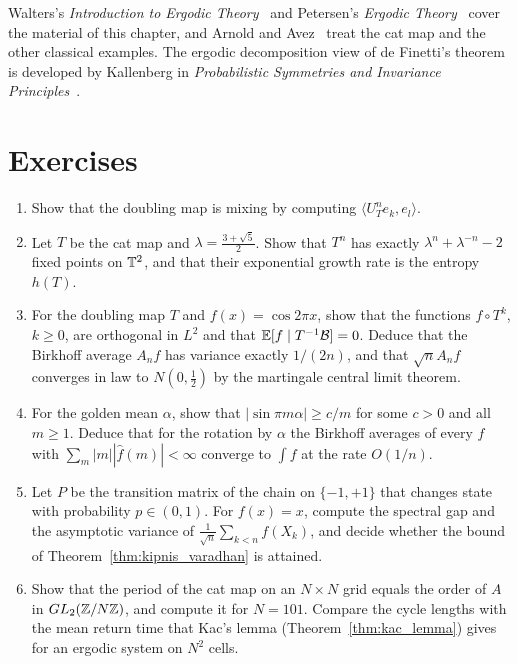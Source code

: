 Walters's \emph{Introduction to Ergodic Theory}~\cite{walters1982} and Petersen's \emph{Ergodic Theory}~\cite{petersen1983} cover the material of this chapter, and Arnold and Avez~\cite{arnoldavez1968} treat the cat map and the other classical examples. The ergodic decomposition view of de Finetti's theorem is developed by Kallenberg in \emph{Probabilistic Symmetries and Invariance Principles}~\cite{kallenberg2005}.

\section*{Exercises}
\begin{enumerate}
\item Show that the doubling map is mixing by computing $\langle U_T^ne_k,e_l\rangle$.
\item Let $T$ be the cat map and $\lambda = \frac{3+\sqrt5}{2}$. Show that $T^n$ has exactly $\lambda^n+\lambda^{-n}-2$ fixed points on $\mathbb{T}^2$, and that their exponential growth rate is the entropy $h(T)$.
\item For the doubling map $T$ and $f(x) = \cos2\pi x$, show that the functions $f\circ T^k$, $k\geq0$, are orthogonal in $L^2$ and that $\mathbb{E}[f\mid T^{-1}\mathcal{B}] = 0$. Deduce that the Birkhoff average $A_nf$ has variance exactly $1/(2n)$, and that $\sqrt nA_nf$ converges in law to $N(0,\frac12)$ by the martingale central limit theorem.
\item For the golden mean $\alpha$, show that $|\sin\pi m\alpha|\geq c/m$ for some $c>0$ and all $m\geq1$. Deduce that for the rotation by $\alpha$ the Birkhoff averages of every $f$ with $\sum_m|m||\hat f(m)|<\infty$ converge to $\int f$ at the rate $O(1/n)$.
\item Let $P$ be the transition matrix of the chain on $\{-1,+1\}$ that changes state with probability $p\in(0,1)$. For $f(x) = x$, compute the spectral gap and the asymptotic variance of $\frac{1}{\sqrt n}\sum_{k<n}f(X_k)$, and decide whether the bound of Theorem~\ref{thm:kipnis_varadhan} is attained.
\item Show that the period of the cat map on an $N\times N$ grid equals the order of $A$ in $GL_2(\mathbb{Z}/N\mathbb{Z})$, and compute it for $N = 101$. Compare the cycle lengths with the mean return time that Kac's lemma (Theorem~\ref{thm:kac_lemma}) gives for an ergodic system on $N^2$ cells.
\end{enumerate}
